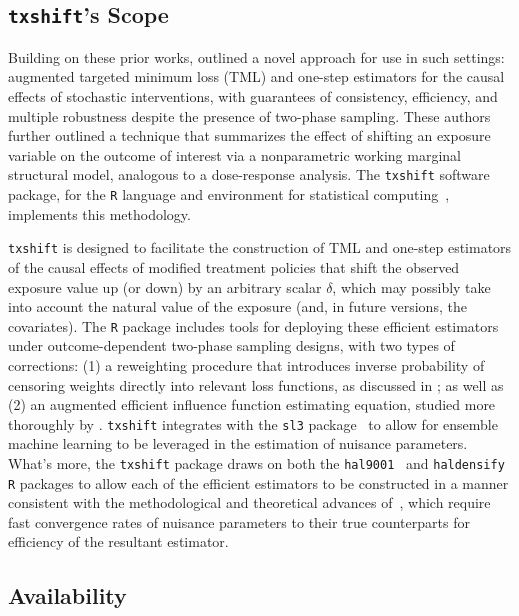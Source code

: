 \subsection{\texttt{txshift}'s Scope}

Building on these prior works, \citet{hejazi2020efficient} outlined a novel
approach for use in such settings: augmented targeted minimum loss (TML) and
one-step estimators for the causal effects of stochastic interventions, with
guarantees of consistency, efficiency, and multiple robustness despite the
presence of two-phase sampling. These authors further outlined a technique that
summarizes the effect of shifting an exposure variable on the outcome of
interest via a nonparametric working marginal structural model, analogous to
a dose-response analysis. The \texttt{txshift} software package, for the
\texttt{R} language and environment for statistical computing~\citep{R},
implements this methodology.

\texttt{txshift} is designed to facilitate the construction of TML and one-step
estimators of the causal effects of modified treatment policies that shift the
observed exposure value up (or down) by an arbitrary scalar $\delta$, which may
possibly take into account the natural value of the exposure (and, in future
versions, the covariates). The \texttt{R} package includes tools for deploying
these efficient estimators under outcome-dependent two-phase sampling designs,
with two types of corrections: (1) a reweighting procedure that introduces
inverse probability of censoring weights directly into relevant loss functions,
as discussed in \citet{rose2011targeted2sd}; as well as (2) an augmented
efficient influence function estimating equation, studied more thoroughly by
\citet{hejazi2020efficient}. \texttt{txshift} integrates with the \texttt{sl3}
package~\citep{coyle2021sl3} to allow for ensemble machine learning to be
leveraged in the estimation of nuisance parameters. What's more, the
\texttt{txshift} package draws on both the
\texttt{hal9001}~\citep{coyle2021hal9001,hejazi2020hal9001} and
\texttt{haldensify}~\citep{hejazi2021haldensify} \texttt{R} packages to allow
each of the efficient estimators to be constructed in a manner consistent with
the methodological and theoretical advances of~\citet{hejazi2020efficient},
which require fast convergence rates of nuisance parameters to their true
counterparts for efficiency of the resultant estimator.

\subsection{Availability}

